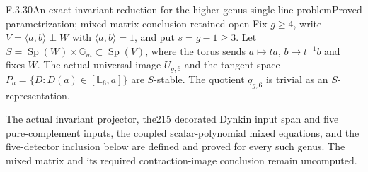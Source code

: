 \begin{result}{F.3.30}{An exact invariant reduction for the higher-genus single-line problem}{Proved parametrization; mixed-matrix conclusion retained open}
Fix $g\geq4$, write $V=\langle a,b\rangle\perp W$ with
$\langle a,b\rangle=1$, and put $s=g-1\geq3$.
Let $S=\operatorname{Sp}(W)\times\mathbb G_m\subset
\operatorname{Sp}(V)$, where the torus sends $a\mapsto ta$,
$b\mapsto t^{-1}b$ and fixes $W$.
The actual universal image $U_{g,6}$ and the tangent space
$P_a=\{D:D(a)\in[\mathbb L_6,a]\}$ are $S$-stable.
The quotient $q_{g,6}$ is trivial as an $S$-representation.

The actual invariant projector, the215 decorated Dynkin input
span and five pure-complement inputs, the coupled scalar-polynomial
mixed equations, and the five-detector inclusion below are defined
and proved for every such genus. The mixed matrix and its required
contraction-image conclusion remain uncomputed.
\end{result}

